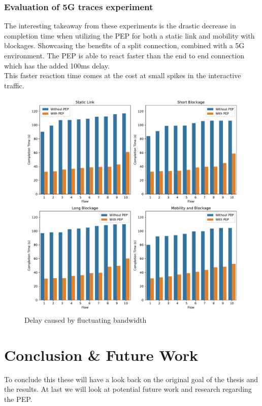 \documentclass[a4paper,english, 11pt]{report}
\begin{document}
\subsection{Evaluation of 5G traces experiment}

The interesting takeaway from these experiments is the drastic decrease in completion time when utilizing the PEP for both a static link and mobility with blockages. Showcasing the benefits of a split connection, combined with a 5G environment. The PEP is able to react faster than the end to end connection which has the added 100ms delay.\\

This faster reaction time comes at the cost at small spikes in the interactive traffic.

\begin{figure}[h!] %
	\centering
	\includegraphics[scale=0.40]{../diagrams/witestlab/all_bars.pdf}
  	\caption{Delay caused by fluctuating bandwidth}
  	\label{fig:witestlab_graph_delay}
\end{figure}

\chapter{Conclusion \& Future Work}
To conclude this these will have a look back on the original goal of the thesis and the results. At last we will look at potential future work and research regarding the PEP.
\end{document}
